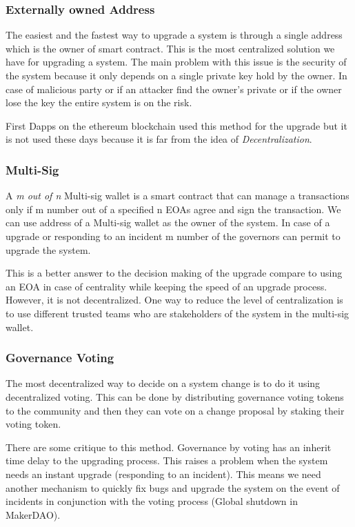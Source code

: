  \subsubsection{Externally owned Address}
The easiest and the fastest way to upgrade a system is through a single address which is the owner of smart contract. This is the most centralized solution we have for upgrading a system. The main problem with this issue is the security of the system because it only depends on a single private key hold by the owner. In case of malicious party or if an attacker find the owner's private or if the owner lose the key the entire system is on the risk.

First Dapps on the ethereum blockchain used this method for the upgrade but it is not used these days because it is far from the idea of \textit{Decentralization}. 

 \subsubsection{Multi-Sig}
 A \textit{m out of n} Multi-sig wallet is a smart contract that can manage a transactions only if m number out of a specified n EOAs agree and sign the transaction. We can use address of a Multi-sig wallet as the owner of the system. In case of a upgrade or responding to an incident m number of the governors can permit to upgrade the system.

 This is a better answer to the decision making of the upgrade compare to using an EOA in case of centrality while keeping the speed of an upgrade process. However, it is not decentralized. One way to reduce the level of centralization is to use different trusted teams who are stakeholders of the system in the multi-sig wallet. 


\subsubsection{Governance Voting}
The most decentralized way to decide on a system change is to do it using decentralized voting. This can be done by distributing governance voting tokens to the community and then they can vote on a change proposal by staking their voting token. 

There are some critique to this method. Governance by voting has an inherit time delay to the upgrading process. This raises a problem when the system needs an instant upgrade (\eg responding to an incident). This means we need another mechanism to quickly fix bugs and upgrade the system on the event of incidents in conjunction with the voting process (\eg Global shutdown in MakerDAO).


